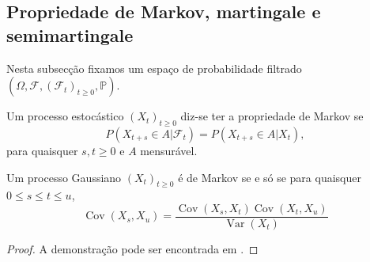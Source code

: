 \documentclass{article}
\begin{document}
\subsection{Propriedade de Markov, martingale e semimartingale}
Nesta subsecção fixamos um espaço de probabilidade filtrado $(\Omega, \mathcal{F},(\mathcal{F}_t)_{t \geq 0}, \mathbb{P})$.

\begin{dfn}
Um processo estocástico $(X_t)_{t\geq 0}$ diz-se ter a propriedade de Markov se
\begin{equation*}
    P(X_{t+s}\in A|\mathcal{F}_t)=P(X_{t+s} \in A |X_t),
\end{equation*}
para quaisquer $s,t \geq 0$ e $A$ mensurável.
\end{dfn}

\begin{prop}
    Um processo Gaussiano $(X_t)_{t\geq0}$ é de Markov se e só se para quaisquer $0\leq s \leq t \leq u$, 
    $$\operatorname{Cov}(X_s,X_u)=\frac{\operatorname{Cov}(X_s,X_t)\operatorname{Cov}(X_t,X_u)}{\operatorname{Var}(X_t)}$$
\end{prop}
\begin{proof}
    A demonstração pode ser encontrada em \cite{Kallenberg1997}.
\end{proof}

\vspace{1cm}
\end{document}
